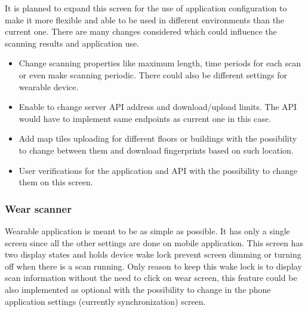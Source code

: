 It is planned to expand this screen for the use of application configuration to make it more flexible and able to be used in different environments than the current one. There are many changes considered which could influence the scanning results and application use.

\begin{itemize}
	\item Change scanning properties like maximum length, time periods for each scan or even make scanning periodic. There could also be different settings for wearable device.
	\item Enable to change server API address and download/upload limits. The API would have to implement same endpoints as current one in this case.
	\item Add map tiles uploading for different floors or buildings with the possibility to change between them and download fingerprints based on such location.
	\item User verifications for the application and API with the possibility to change them on this screen.
\end{itemize}

\subsubsection{Wear scanner}\label{subsec:WearableScanner}
Wearable application is meant to be as simple as possible. It has only a single screen since all the other settings are done on mobile application. This screen has two display states and holds device wake lock prevent screen dimming or turning off when there is a scan running. Only reason to keep this wake lock is to display scan information without the need to click on wear screen, this feature could be also implemented as optional with the possibility to change in the phone application settings (currently synchronization) screen. 


